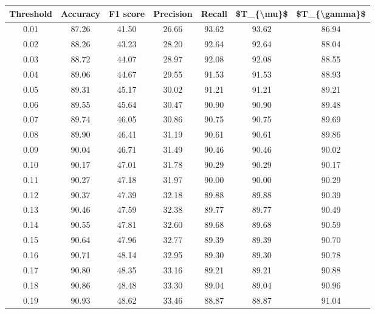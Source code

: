 \begin{tabular}{|c|c|c|c|c|c|c|}
\hline
 Threshold &  Accuracy &  F1 score &  Precision &  Recall &  \$T\_\{\textbackslash mu\}\$ &  \$T\_\{\textbackslash gamma\}\$ \\
\hline
      0.01 &     87.26 &     41.50 &      26.66 &   93.62 &      93.62 &         86.94 \\
      0.02 &     88.26 &     43.23 &      28.20 &   92.64 &      92.64 &         88.04 \\
      0.03 &     88.72 &     44.07 &      28.97 &   92.08 &      92.08 &         88.55 \\
      0.04 &     89.06 &     44.67 &      29.55 &   91.53 &      91.53 &         88.93 \\
      0.05 &     89.31 &     45.17 &      30.02 &   91.21 &      91.21 &         89.21 \\
      0.06 &     89.55 &     45.64 &      30.47 &   90.90 &      90.90 &         89.48 \\
      0.07 &     89.74 &     46.05 &      30.86 &   90.75 &      90.75 &         89.69 \\
      0.08 &     89.90 &     46.41 &      31.19 &   90.61 &      90.61 &         89.86 \\
      0.09 &     90.04 &     46.71 &      31.49 &   90.46 &      90.46 &         90.02 \\
      0.10 &     90.17 &     47.01 &      31.78 &   90.29 &      90.29 &         90.17 \\
      0.11 &     90.27 &     47.18 &      31.97 &   90.00 &      90.00 &         90.29 \\
      0.12 &     90.37 &     47.39 &      32.18 &   89.88 &      89.88 &         90.39 \\
      0.13 &     90.46 &     47.59 &      32.38 &   89.77 &      89.77 &         90.49 \\
      0.14 &     90.55 &     47.81 &      32.60 &   89.68 &      89.68 &         90.59 \\
      0.15 &     90.64 &     47.96 &      32.77 &   89.39 &      89.39 &         90.70 \\
      0.16 &     90.71 &     48.14 &      32.95 &   89.30 &      89.30 &         90.78 \\
      0.17 &     90.80 &     48.35 &      33.16 &   89.21 &      89.21 &         90.88 \\
      0.18 &     90.86 &     48.48 &      33.30 &   89.04 &      89.04 &         90.96 \\
      0.19 &     90.93 &     48.62 &      33.46 &   88.87 &      88.87 &         91.04 \\

\end{tabular}

